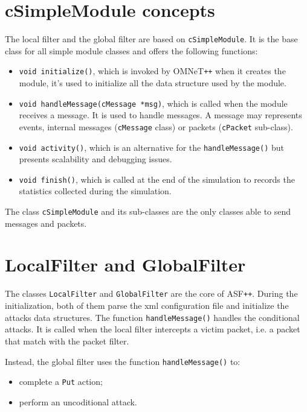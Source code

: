 \section{cSimpleModule concepts}
The local filter and the global filter are based on \texttt{cSimpleModule}. It is the base class for all simple module classes and offers the following functions:
%
\begin{itemize}
\item \texttt{void initialize()}, which is invoked by OMNeT\texttt{++} when it creates the module, it's used to initialize all the data structure used by the module.
\item \texttt{void handleMessage(cMessage *msg)},  which is called when the module receives a message. It is used to handle messages. A message may represents events, internal messages (\texttt{cMessage} class) or packets (\texttt{cPacket} sub-class).
\item \texttt{void activity()}, which is an alternative for the \texttt{handleMessage()} but presents scalability and debugging issues.
\item \texttt{void finish()}, which is called at the end of the simulation to records the statistics collected during the simulation.
\end{itemize}
%
The class \texttt{cSimpleModule} and its sub-classes are the only classes able to send messages and packets. %


\section{LocalFilter and GlobalFilter}
\label{sec:filters}
The classes \texttt{LocalFilter} and \texttt{GlobalFilter} are the core of ASF\texttt{++}. During the initialization, both of them parse the xml configuration file and initialize the attacks data structures. 
The function \texttt{handleMessage()} handles the conditional attacks. It is called when the local filter intercepts a victim packet, i.e. a packet that match with the packet filter.

Instead, the global filter uses the function \texttt{handleMessage()} to:
%
\begin{itemize}
\item complete a \texttt{Put} action;
\item perform an uncoditional attack.
\end{itemize}

